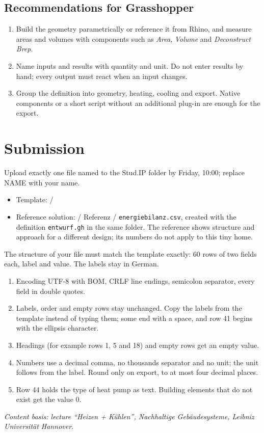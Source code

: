 \subsection{Recommendations for Grasshopper}
\begin{enumerate}
\item Build the geometry parametrically or reference it from Rhino, and measure areas and volumes with components such as \emph{Area}, \emph{Volume} and \emph{Deconstruct Brep}.
\item Name inputs and results with quantity and unit. Do not enter results by hand; every output must react when an input changes.
\item Group the definition into geometry, heating, cooling and export. Native components or a short script without an additional plug-in are enough for the export.
\end{enumerate}
\section{Submission}
Upload exactly one file named \EnergySubmissionFile{} to the Stud.IP folder \emph{\EnergyStudIpUpload} by Friday, 10:00; replace NAME with your name.
\begin{itemize}
\item Template: \EnergyStudIpFiles{} / \EnergyTemplateFile
\item Reference solution: \EnergyStudIpFiles{} / Referenz / \texttt{energiebilanz.csv}, created with the definition \texttt{entwurf.gh} in the same folder. The reference shows structure and approach for a different design; its numbers do not apply to this tiny home.
\end{itemize}
The structure of your file must match the template exactly: 60 rows of two fields each, label and value. The labels stay in German.
\begin{enumerate}
\item Encoding UTF-8 with BOM, CRLF line endings, semicolon separator, every field in double quotes.
\item Labels, order and empty rows stay unchanged. Copy the labels from the template instead of typing them; some end with a space, and row 41 begins with the ellipsis character.
\item Headings (for example rows 1, 5 and 18) and empty rows get an empty value.
\item Numbers use a decimal comma, no thousands separator and no unit; the unit follows from the label. Round only on export, to at most four decimal places.
\item Row 44 holds the type of heat pump as text. Building elements that do not exist get the value 0.
\end{enumerate}
\EnergyCsvTemplate

\small\textit{Content basis: lecture “Heizen + Kühlen”, Nachhaltige Gebäudesysteme, Leibniz Universität Hannover.}

